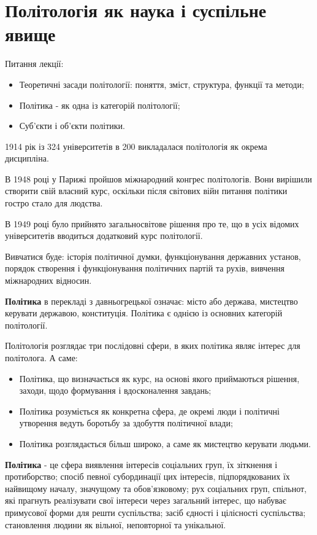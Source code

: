 \section{Політологія як наука і суспільне явище}
Питання лекції:
\begin{itemize}
\item Теоретичні засади політології: поняття, зміст, структура, функції та методи;
\item Політика - як одна із категорій політології;
\item Суб’єкти і об’єкти політики.
\end{itemize}

1914 рік із 324 університетів в 200 викладалася політологія як окрема дисципліна.

В 1948 році у Парижі пройшов міжнародний конгрес політологів. Вони вирішили створити свій власний курс, оскільки після світових війн питання політики гостро стало для людства.

В 1949 році було прийнято загальносвітове рішення про те, що в усіх відомих університетів вводиться додатковий курс політології.

Вивчатися буде: історія політичної думки, функціонування державних установ, порядок створення і функціонування політичних партій та рухів, вивчення міжнародних відносин.

{\bf Політика} в перекладі з давньогрецької означає: місто або держава, мистецтво керувати державою, конституція. Політика є однією із основних %
категорій політології.

Політологія розглядає три послідовні сфери, в яких політика являє інтерес для політолога. А саме:
\begin{itemize}
\item Політика, що визначається як курс, на основі якого приймаються рішення, заходи, щодо формування і вдосконалення завдань;
\item Політика розуміється як конкретна сфера, де окремі люди і політичні утворення ведуть боротьбу за здобуття політичної влади;
\item Політика розглядається більш широко, а саме як мистецтво керувати людьми.
\end{itemize}

{\bf Політика} - це сфера виявлення інтересів соціальних груп, їх зіткнення і протиборство; спосіб певної субординації цих інтересів, підпорядкованих їх найвищому началу, значущому та обов’язковому; рух соціальних груп, спільнот, які прагнуть реалізувати свої інтереси через загальний інтерес, що набуває примусової форми для решти суспільства; засіб єдності і цілісності суспільства; становлення людини як вільної, неповторної та унікальної.


